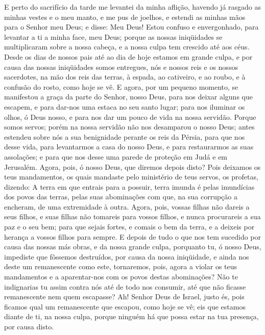 E perto do sacrifício da tarde me levantei da minha aflição,
havendo já rasgado as minhas vestes e o meu manto, e me pus de
joelhos, e estendi as minhas mãos para o Senhor meu Deus; e
disse: Meu Deus! Estou confuso e envergonhado, para levantar a ti a
minha face, meu Deus; porque as nossas iniqüidades se multiplicaram
sobre a nossa cabeça, e a nossa culpa tem crescido até aos céus.
Desde os dias de nossos pais até ao dia de hoje estamos em
grande culpa, e por causa das nossas iniqüidades somos entregues,
nós e nossos reis e os nossos sacerdotes, na mão dos reis das
terras, à espada, ao cativeiro, e ao roubo, e à confusão do rosto,
como hoje se vê. E agora, por um pequeno momento, se manifestou
a graça da parte do Senhor, nosso Deus, para nos deixar alguns que
escapem, e para dar-nos uma estaca no seu santo lugar; para nos
iluminar os olhos, ó Deus nosso, e para nos dar um pouco de vida na
nossa servidão. Porque somos servos; porém na nossa servidão não
nos desamparou o nosso Deus; antes estendeu sobre nós a sua
benignidade perante os reis da Pérsia, para que nos desse vida, para
levantarmos a casa do nosso Deus, e para restaurarmos as suas
assolações; e para que nos desse uma parede de proteção em Judá e em
Jerusalém. Agora, pois, ó nosso Deus, que diremos depois
disto? Pois deixamos os teus mandamentos, os quais mandaste
pelo ministério de teus servos, os profetas, dizendo: A terra em que
entrais para a possuir, terra imunda é pelas imundícias dos povos
das terras, pelas suas abominações com que, na sua corrupção a
encheram, de uma extremidade à outra. Agora, pois, vossas
filhas não dareis a seus filhos, e suas filhas não tomareis para
vossos filhos, e nunca procurareis a sua paz e o seu bem; para que
sejais fortes, e comais o bem da terra, e a deixeis por herança a
vossos filhos para sempre. E depois de tudo o que nos tem
sucedido por causa das nossas más obras, e da nossa grande culpa,
porquanto tu, ó nosso Deus, impediste que fôssemos destruídos, por
causa da nossa iniqüidade, e ainda nos deste um remanescente como
este, tornaremos, pois, agora a violar os teus mandamentos e
a aparentar-nos com os povos destas abominações? Não te indignarias
tu assim contra nós até de todo nos consumir, até que não ficasse
remanescente nem quem escapasse? Ah! Senhor Deus de Israel,
justo és, pois ficamos qual um remanescente que escapou, como hoje
se vê; eis que estamos diante de ti, na nossa culpa, porque ninguém
há que possa estar na tua presença, por causa disto.

\medskip

